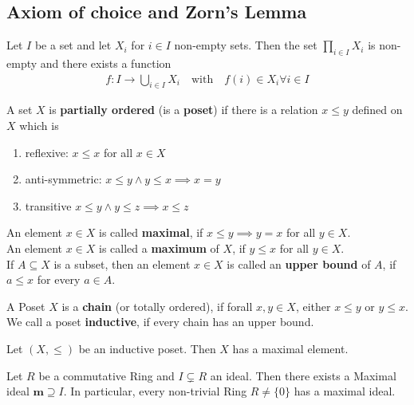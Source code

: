 \subsection{Axiom of choice and Zorn's Lemma}

\begin{nsatz}
Let $I$ be a set and let $X_i$ for $i \in I$ non-empty sets. Then the set $\prod_{i \in I}X_i$ is non-empty and there exists a function
\begin{align*}
	f: I \to \bigcup_{i \in I} X_i \quad \text{with} \quad f(i) \in X_i \forall i \in I
\end{align*}
\end{nsatz}

\begin{definition}[Poset]
	A set $X$ is \textbf{partially ordered} (is a \textbf{poset}) if there is a relation $x \leq y$ defined on $X$ which is
	\begin{enumerate}
	\item reflexive: $x \leq x$ for all $x \in X$
	\item anti-symmetric: $x \leq y \land y \leq x \implies x = y$
	\item transitive $x \leq y \land y \leq z \implies x \leq z$
	\end{enumerate}
	An element $x \in X$ is called \textbf{maximal}, if $x \leq y \implies y = x$ for all $y \in X$.\\
	An element $x \in X$ is called a \textbf{maximum}  of $X$, if $y \leq x$ for all $y \in X$.\\
	If $A \subseteq X$ is a subset, then an element $x \in X$ is called an \textbf{upper bound}  of $A$, if $a \leq x$ for every $a \in A$.
\end{definition}

\begin{definition}[chain]
	A Poset $X$ is a \textbf{chain} (or totally ordered), if forall $x,y \in X$, either $x \leq y$ or $y \leq x$.\\
We call a poset \textbf{inductive}, if every chain has an upper bound.
\end{definition}


\begin{ntheorem}
	Let $(X,\leq)$ be an inductive poset. Then $X$ has a maximal element.
\end{ntheorem}


\begin{theorem}[]
	Let $R$ be a commutative Ring and $I \subsetneq R$ an ideal. Then there exists a Maximal ideal $\bm{m} \supseteq I$. In particular, every non-trivial Ring $R \neq \{0\}$ has a maximal ideal.
\end{theorem}


